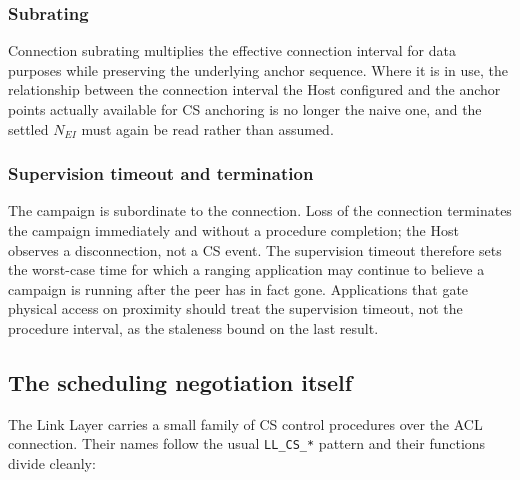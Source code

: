 \documentclass[11pt,a4paper]{article}
\newcommand{\code}[1]{\texttt{\small #1}}
\newcommand{\Nei}{N_{EI}}
\begin{document}
\subsubsection{Subrating}

Connection subrating multiplies the effective connection interval for data purposes while preserving
the underlying anchor sequence. Where it is in use, the relationship between the connection interval
the Host configured and the anchor points actually available for CS anchoring is no longer the naive
one, and the settled $\Nei$ must again be read rather than assumed.

\subsubsection{Supervision timeout and termination}

The campaign is subordinate to the connection. Loss of the connection terminates the campaign
immediately and without a procedure completion; the Host observes a disconnection, not a CS event.
The supervision timeout therefore sets the worst-case time for which a ranging application may
continue to believe a campaign is running after the peer has in fact gone. Applications that gate
physical access on proximity should treat the supervision timeout, not the procedure interval, as the
staleness bound on the last result.

\subsection{The scheduling negotiation itself}
\label{sec:acl-negotiation}

The Link Layer carries a small family of CS control procedures over the ACL connection. Their names
follow the usual \code{LL\_CS\_*} pattern and their functions divide cleanly:
\end{document}

